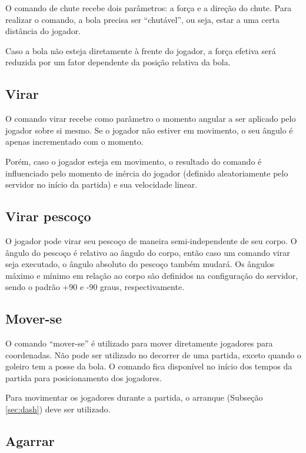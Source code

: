 O comando de chute recebe dois parâmetros: a força e a direção do chute. Para realizar o comando, a bola precisa ser ``chutável'', ou seja, estar a uma certa distância do jogador.

Caso a bola não esteja diretamente à frente do jogador, a força efetiva será reduzida por um fator dependente da posição relativa da bola.

\subsection{Virar}

O comando virar recebe como parâmetro o momento angular a ser aplicado pelo jogador sobre si mesmo. Se o jogador não estiver em movimento, o seu ângulo é apenas incrementado com o momento.

Porém, caso o jogador esteja em movimento, o resultado do comando é influenciado pelo momento de inércia do jogador (definido aleatoriamente pelo servidor no início da partida) e sua velocidade linear.

\subsection{Virar pescoço}

O jogador pode virar seu pescoço de maneira semi-independente de seu corpo. O ângulo do pescoço é relativo ao ângulo do corpo, então caso um comando virar seja executado, o ângulo absoluto do pescoço também mudará. Os ângulos máximo e mínimo em relação ao corpo são definidos na configuração do servidor, sendo o padrão +90 e -90 graus, respectivamente.

\subsection{Mover-se}
\label{sec:move}

O comando ``mover-se'' é utilizado para mover diretamente jogadores para coordenadas. Não pode ser utilizado no decorrer de uma partida, exceto quando o goleiro tem a posse da bola. O comando fica disponível no início dos tempos da partida para posicionamento dos jogadores.

Para movimentar os jogadores durante a partida, o arranque (Subseção \ref{sec:dash}) deve ser utilizado.

\subsection{Agarrar}


